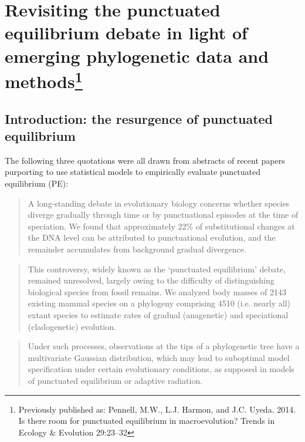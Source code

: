\chapter[Revisiting the punctuated equilibrium debate in light of emerging phylogenetic data and methods]{Revisiting the punctuated equilibrium debate in light of emerging phylogenetic data and methods\footnote{Previously published as: Pennell, M.W., L.J. Harmon, and J.C. Uyeda. 2014.
  Is there room for punctuated equilibrium in macroevolution?
  Trends in Ecology \& Evolution 29:23--32}}
\label{chap:punceq}

\section{Introduction: the resurgence of punctuated equilibrium}

The following three quotations were all drawn from abstracts of recent papers purporting to use statistical models to empirically evaluate punctuated equilibrium (PE):

\begin{quote}
\singlespacing
A long-standing debate in evolutionary biology concerns whether species diverge gradually through time or by punctuational episodes at the time of speciation. We found that approximately 22\% of substitutional changes at the DNA level can be attributed to punctuational evolution, and the remainder accumulates from background gradual divergence. \citep[][p. 119]{Pagel2006}
\end{quote}

\begin{quote}
\singlespacing
This controversy, widely known as the `punctuated equilibrium' debate, remained unresolved, largely owing to the difficulty of distinguishing biological species from fossil remains. We analyzed body masses of 2143 existing mammal species on a phylogeny comprising 4510 (i.e. nearly all) extant species to estimate rates of gradual (anagenetic) and speciational (cladogenetic) evolution. \citep[][p. 2195]{Mattila2008}
\end{quote}

\begin{quote}
\singlespacing
Under such processes, observations at the tips of a phylogenetic tree have a multivariate Gaussian distribution, which may lead to suboptimal model specification under certain evolutionary conditions, as supposed in models of punctuated equilibrium or adaptive radiation. \citep[][p. 193]{Landis2012}
\end{quote}

